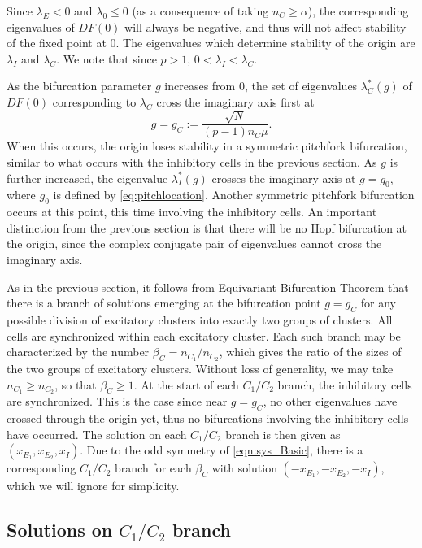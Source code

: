 \documentclass[reqno]{siamonline190516}
\begin{document}
Since $\lambda_E < 0$ and $\lambda_0 \leq 0$ (as a consequence of taking $n_C \geq \alpha$), the corresponding eigenvalues of $DF(0)$ will always be negative, and thus will not affect stability of the fixed point at 0. The eigenvalues which determine stability of the origin are $\lambda_I$ and $\lambda_C$. We note that since $p > 1$, $0 < \lambda_I < \lambda_C$.

As the bifurcation parameter $g$ increases from 0, the set of eigenvalues $\lambda_C^*(g)$ of $DF(0)$ corresponding to $\lambda_C$ cross the imaginary axis first at 
\begin{equation}
    g = g_C := \frac{\sqrt{N}}{(p-1) n_C \mu}.
\end{equation}
When this occurs, the origin loses stability in a symmetric pitchfork bifurcation, similar to what occurs with the inhibitory cells in the previous section. As $g$ is further increased, the eigenvalue $\lambda_I^*(g)$ crosses the imaginary axis at $g = g_0$, where $g_0$ is defined by \cref{eq:pitchlocation}. Another symmetric pitchfork bifurcation occurs at this point, this time involving the inhibitory cells. An important distinction from the previous section is that there will be no Hopf bifurcation at the origin, since the complex conjugate pair of eigenvalues cannot cross the imaginary axis.

As in the previous section, it follows from Equivariant Bifurcation Theorem that there is a branch of solutions emerging at the bifurcation point $g = g_C$ for any possible division of excitatory clusters into exactly two groups of clusters. All cells are synchronized within each excitatory cluster. Each such branch may be characterized by the number $\beta_C = n_{C_1}/n_{C_2}$, which gives the ratio of the sizes of the two groups of excitatory clusters. Without loss of generality, we may take $n_{C_1} \geq n_{C_2}$, so that $\beta_C \geq 1$. At the start of each $C_1/C_2$ branch, the inhibitory cells are synchronized. This is the case since near $g = g_C$, no other eigenvalues have crossed through the origin yet, thus no bifurcations involving the inhibitory cells have occurred. The solution on each $C_1/C_2$ branch is then given as $(x_{E_1}, x_{E_2}, x_{I})$. Due to the odd symmetry of \cref{eqn:sys_Basic}, there is a corresponding $C_1/C_2$ branch for each $\beta_C$ with solution $(-x_{E_1}, -x_{E_2}, -x_{I})$, which we will ignore for simplicity.


\subsection{Solutions on \texorpdfstring{$C_1/C_2$}{C1/C2} branch}
\end{document}
